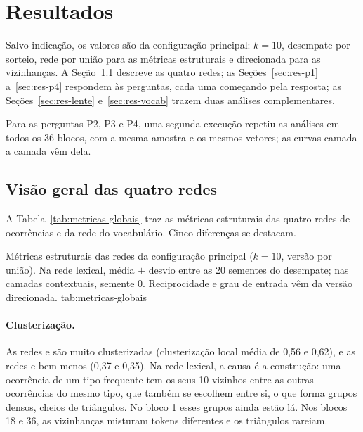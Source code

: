 \section{Resultados}\label{sec:resultados}

Salvo indicação, os valores são da configuração principal: $k=10$, desempate por sorteio,
rede por união para as métricas estruturais e direcionada para as vizinhanças. A
Seção~\ref{sec:res-geral} descreve as quatro redes; as Seções~\ref{sec:res-p1}
a~\ref{sec:res-p4} respondem às perguntas, cada uma começando pela resposta; as
Seções~\ref{sec:res-lente} e~\ref{sec:res-vocab} trazem duas análises complementares.

Para as perguntas P2, P3 e P4, uma segunda execução repetiu as análises em todos os 36 blocos,
com a mesma amostra e os mesmos vetores; as curvas camada a camada vêm dela.

\subsection{Visão geral das quatro redes}\label{sec:res-geral}

A Tabela~\ref{tab:metricas-globais} traz as métricas estruturais das quatro redes de
ocorrências e da rede do vocabulário. Cinco diferenças se destacam.

    {Métricas estruturais das redes da configuração principal ($k=10$, versão por união).
    Na rede lexical, média $\pm$ desvio entre as 20 sementes do desempate; nas camadas
    contextuais, semente 0. Reciprocidade e grau de entrada vêm da versão direcionada.}
    {tab:metricas-globais}

\paragraph{Clusterização.} As redes  e  são muito clusterizadas
(clusterização local média de 0,56 e 0,62), e as redes  e  bem menos (0,37 e
0,35). Na rede lexical, a causa é a construção: uma ocorrência de um tipo frequente tem os seus
10 vizinhos entre as outras ocorrências do mesmo tipo, que também se escolhem entre si, o que
forma grupos densos, cheios de triângulos. No bloco 1 esses grupos ainda estão lá. Nos blocos
18 e 36, as vizinhanças misturam tokens diferentes e os triângulos rareiam.

